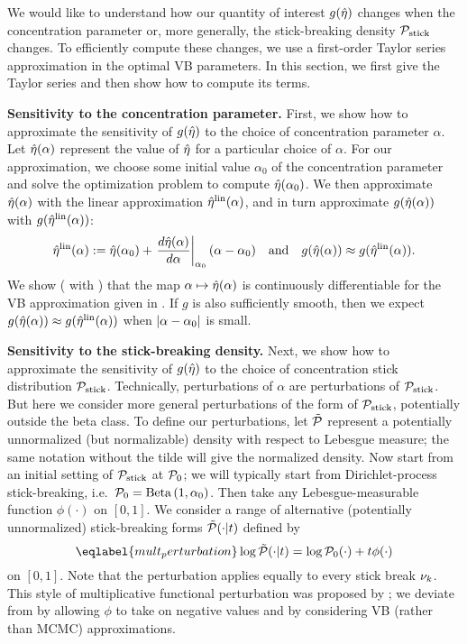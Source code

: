 We would like to understand how our quantity of interest $g(\hat\eta)$ changes
when the concentration parameter or, more generally, the stick-breaking density
$\mathcal{P}_{\mathrm{stick}}$ changes. To efficiently compute these changes, we use a first-order
Taylor series approximation in the optimal VB parameters. In this section, we
first give the Taylor series and then show how to compute its terms.

\noindent \textbf{Sensitivity to the concentration parameter.} First, we show
how to approximate the sensitivity of $g(\hat\eta)$ to the choice of
concentration parameter $\alpha$. Let $\hat\eta(\alpha)$ represent the value of
$\hat\eta$ for a particular choice of $\alpha$. For our approximation, we choose
some initial value $\alpha_0$ of the concentration parameter and solve the
optimization problem to compute $\hat\eta(\alpha_0)$. We then approximate
$\hat\eta(\alpha)$ with the linear approximation $\hat\eta^{\mathrm{lin}}(\alpha)$, and in turn
approximate $g(\hat\eta(\alpha))$ with $g(\hat\eta^{\mathrm{lin}}(\alpha))$:
%
\begin{align*}
%
\etalin(\alpha) :=
    \etaopt(\alpha_0) +
    \fracat{d\etaopt(\alpha)}{d\alpha}{\alpha_0} (\alpha - \alpha_0)
\mathand
g(\etaopt(\alpha)) \approx g(\etalin(\alpha)).
%
\end{align*}
%
We show ( with ) that the map
$\alpha \mapsto \hat\eta(\alpha)$ is continuously differentiable for the VB
approximation given in . If $g$ is also sufficiently smooth,
then we expect $g(\hat\eta(\alpha)) \approx g(\hat\eta^{\mathrm{lin}}(\alpha))$ when $\left|\alpha -
\alpha_0\right|$ is small.

\noindent \textbf{Sensitivity to the stick-breaking density.} Next, we show how
to approximate the sensitivity of $g(\hat\eta)$ to the choice of concentration
stick distribution $\mathcal{P}_{\mathrm{stick}}$. Technically, perturbations of $\alpha$ are
perturbations of $\mathcal{P}_{\mathrm{stick}}$. But here we consider more general perturbations of
the form of $\mathcal{P}_{\mathrm{stick}}$, potentially outside the beta class. To define our
perturbations, let $\tilde{\mathcal{P}}$ represent a potentially unnormalized (but
normalizable) density with respect to Lebesgue measure; the same notation
without the tilde will give the normalized density. Now start from an initial
setting of $\mathcal{P}_{\mathrm{stick}}$ at $\mathcal{P}_{0}$; we will typically start from Dirichlet-process
stick-breaking, i.e.\ $\mathcal{P}_{0} = \mathrm{Beta}\left(1,\alpha_0\right)$. Then take any
Lebesgue-measurable function $\phi(\cdot)$ on $[0,1]$. We consider a range of
alternative (potentially unnormalized) stick-breaking forms $\tilde{\mathcal{P}}(\cdot \vert
t)$ defined by
%
\begin{equation} \eqlabel{mult_perturbation}
	\log \ptil(\cdot \vert \t) = \log \pbase(\cdot) + \t \phi(\cdot)
\end{equation}
%
on $[0,1]$. Note that the perturbation applies equally to every stick break
$\nu_{k}$. This style of multiplicative functional perturbation was proposed by
\citet{gustafson:1996:local}; we deviate from \citet{gustafson:1996:local} by
allowing $\phi$ to take on negative values and by considering VB (rather than
MCMC) approximations.

